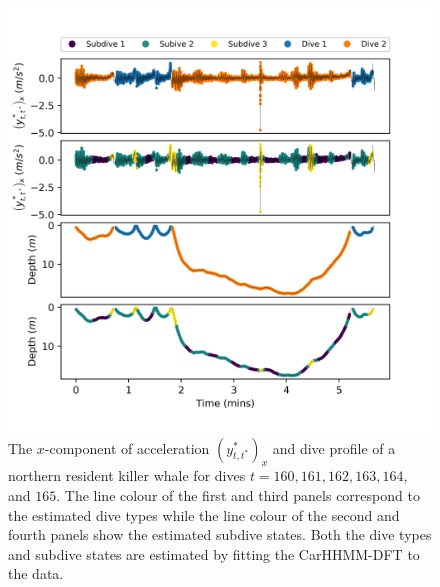 \begin{figure}[ht]
	\centering
	\includegraphics[width=5in]{../Plots/CarHHMM2_decoded_dives.png}
	\caption{The $x$-component of acceleration $\left(y^*_{t,t^*}\right)_x$ and dive profile of a northern resident killer whale for dives $t = 160,161,162,163,164,$ and $165$. The line colour of the first and third panels correspond to the estimated dive types while the line colour of the second and fourth panels show the estimated subdive states. Both the dive types and subdive states are estimated by fitting the CarHHMM-DFT to the data.}
	\label{fig:labeled_dives}
\end{figure}


